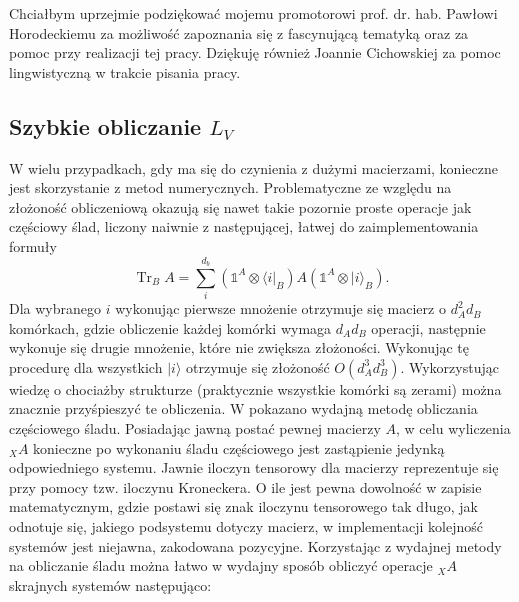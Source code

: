 \documentclass[10pt]{article} %
\DeclareMathOperator{\Trs}{Tr}
\newcommand{\Ket}[1]{|#1\rangle}
\newcommand{\Bra}[1]{\langle#1|}
\newcommand{\I}{\mathbb{1}}
\begin{document}
\renewcommand\appendixname{Dodatek}
\renewcommand\appendixpagename{Dodatek}
\null
\vfill
\begin{minipage}[b]{0.1\textwidth}
\hfill
\end{minipage}
\begin{minipage}[b]{0.9\textwidth}
Chciałbym uprzejmie podziękować mojemu promotorowi prof. dr. hab. Pawłowi Horodeckiemu za możliwość zapoznania się z fascynującą tematyką oraz za pomoc przy realizacji tej pracy. Dziękuję również Joannie Cichowskiej za pomoc lingwistyczną w trakcie pisania pracy.
\end{minipage}
\vspace{2cm}
\clearpage
\newpage


\newpage
\listoffigures\newpage
\begin{appendices}
\section{Szybkie obliczanie $L_V$}
W wielu przypadkach, gdy ma się do czynienia z dużymi macierzami, konieczne jest skorzystanie z metod numerycznych. Problematyczne ze względu na złożoność obliczeniową okazują się nawet takie pozornie proste operacje jak częściowy ślad, liczony naiwnie z następującej, łatwej do zaimplementowania formuły
\begin{equation}
\Trs_B A = \sum^{d_b}_i (\I^A \otimes \Bra{i}_B)A(\I^A \otimes \Ket{i}_B).
\end{equation} Dla wybranego $i$ wykonując pierwsze mnożenie otrzymuje się macierz o $d_A^2d_B$ komórkach, gdzie obliczenie każdej komórki wymaga $d_Ad_B$ operacji, następnie wykonuje się drugie mnożenie, które nie zwiększa złożoności. Wykonując tę procedurę dla wszystkich $\Ket{i}$ otrzymuje się złożoność $O(d_A^3d_B^3)$. Wykorzystując wiedzę o chociażby strukturze (praktycznie wszystkie komórki są zerami) można znacznie przyśpieszyć te obliczenia.
W \cite{partial_trace} pokazano wydajną metodę obliczania częściowego śladu. Posiadając jawną postać pewnej macierzy $A$, w celu wyliczenia ${}_XA$ konieczne po wykonaniu śladu częściowego jest zastąpienie jedynką odpowiedniego systemu. Jawnie iloczyn tensorowy dla macierzy reprezentuje się przy pomocy tzw. iloczynu Kroneckera. O ile jest pewna dowolność w zapisie matematycznym, gdzie postawi się znak iloczynu tensorowego tak długo, jak odnotuje się, jakiego podsystemu dotyczy macierz, w implementacji kolejność systemów jest niejawna, zakodowana pozycyjne. Korzystając z wydajnej metody na obliczanie śladu
można łatwo w wydajny sposób obliczyć operacje ${}_XA$ skrajnych systemów następująco:

\end{appendices}
\end{document}
